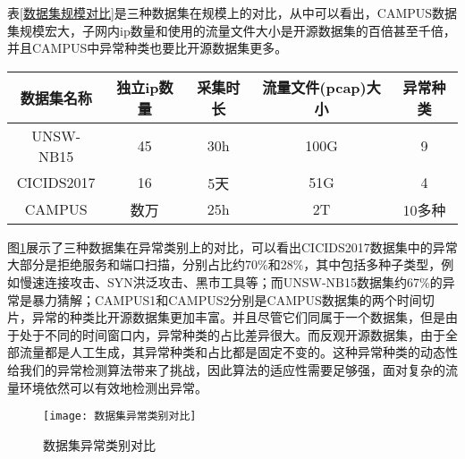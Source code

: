 表\ref{数据集规模对比}是三种数据集在规模上的对比，从中可以看出，CAMPUS数据集规模宏大，子网内ip数量和使用的流量文件大小是开源数据集的百倍甚至千倍，并且CAMPUS中异常种类也要比开源数据集更多。
\begin{table*}[h]
  \small
  \caption{数据集规模对比}
  \label{数据集规模对比}
  \centering
  \begin{tabular}{c|cccc}
  \toprule
  
   数据集名称 &  独立ip数量  & 采集时长 &  流量文件(pcap)大小 & 异常种类 \\
  \midrule
  
  UNSW-NB15 & 45 & 30h & 100G & 9   \\ 
  CICIDS2017 & 16 & 5天 & 51G & 4 \\
  CAMPUS & 数万 & 25h & 2T & 10多种\\
 
   \bottomrule
  
  \end{tabular}
  \end{table*}

图\ref{fig:数据集异常类别对比}展示了三种数据集在异常类别上的对比，可以看出CICIDS2017数据集中的异常大部分是拒绝服务和端口扫描，分别占比约70\%和28\%，其中包括多种子类型，例如慢速连接攻击、SYN洪泛攻击、黑市工具等；而UNSW-NB15数据集约67\%的异常是暴力猜解；CAMPUS1和CAMPUS2分别是CAMPUS数据集的两个时间切片，异常的种类比开源数据集更加丰富。并且尽管它们同属于一个数据集，但是由于处于不同的时间窗口内，异常种类的占比差异很大。而反观开源数据集，由于全部流量都是人工生成，其异常种类和占比都是固定不变的。这种异常种类的动态性给我们的异常检测算法带来了挑战，因此算法的适应性需要足够强，面对复杂的流量环境依然可以有效地检测出异常。

  \begin{figure}
    \centering
    \texttt{[image: 数据集异常类别对比]}
    \caption{数据集异常类别对比}
    \label{fig:数据集异常类别对比}
  \end{figure}



